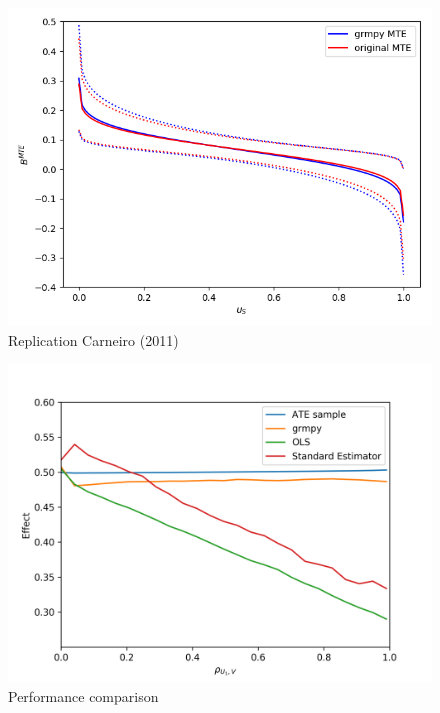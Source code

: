 \begin{frame}

  \begin{figure}
  	\caption{Replication Carneiro (2011)}
    \includegraphics[scale=0.5]{figures/fig-marginal-benefit-parametric-replication.png}
  \end{figure}
\end{frame}

\begin{frame}
\begin{figure}
  \caption{Performance comparison}
  \includegraphics[scale=0.5]{figures/fig1.png}
\end{figure}


\end{frame}

